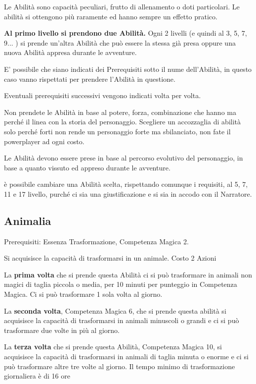 \documentclass[a4paper,11pt,twoside,openany]{book}
\begin{document}
Le Abilità sono capacità peculiari, frutto di allenamento o doti particolari. Le abilità si ottengono più raramente ed hanno sempre un effetto pratico.

\textbf{Al primo livello si prendono due Abilità.} Ogni 2 livelli (e quindi al 3, 5, 7, 9... ) si prende un'altra Abilità che può essere la stessa già presa oppure una nuova Abilità appresa durante le avventure.

E' possibile che siano indicati dei Prerequisiti sotto il nume dell'Abilità, in questo caso vanno rispettati per prendere l'Abilità in questione.

Eventuali prerequisiti successivi vengono indicati volta per volta.

Non prendete le Abilità in base al potere, forza, combinazione che hanno ma perché il linea con la storia del personaggio.
Scegliere un accozzaglia di abilità solo perché forti non rende un personaggio forte ma sbilanciato, non fate il powerplayer ad ogni costo.

\medskip
Le Abilità devono essere prese in base al percorso evolutivo del personaggio, in base a quanto vissuto ed appreso durante le avventure.
\medskip

è possibile cambiare una Abilità scelta, rispettando comunque i requisiti, al 5, 7, 11 e 17 livello, purché ci sia una giustificazione e si sia in accodo con il Narratore.

\subsection{Animalia}

Prerequisiti: Essenza Trasformazione, Competenza Magica 2.

Si acquisisce la capacità di trasformarsi in un animale. Costo 2 Azioni

La \textbf{prima volta} che si prende questa Abilità ci si può trasformare in animali non magici di taglia piccola o media, per 10 minuti per punteggio in Competenza Magica. Ci si può trasformare 1 sola volta al giorno.

La \textbf{seconda volta}, Competenza Magica 6, che si prende questa abilità si acquisisce la capacità di trasformarsi in animali minuscoli o grandi e ci si può trasformare due volte in più al giorno.

La \textbf{terza volta} che si prende questa Abilità, Competenza Magica 10, si acquisisce la capacità di trasformarsi in animali di taglia minuta o enorme e ci si può trasformare altre tre volte al giorno. Il tempo minimo di trasformazione giornaliera è di 16 ore
\end{document}
